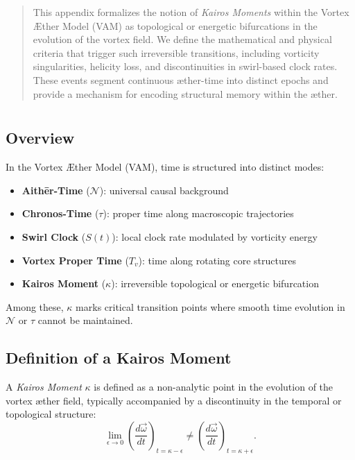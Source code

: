 \documentclass[12pt]{article}
\begin{document}
    \titlepageOpen

    \begin{abstract}
        This appendix formalizes the notion of \textit{Kairos Moments} within the Vortex \AE{}ther Model (VAM) as topological or energetic bifurcations in the evolution of the vortex field. We define the mathematical and physical criteria that trigger such irreversible transitions, including vorticity singularities, helicity loss, and discontinuities in swirl-based clock rates. These events segment continuous æther-time into distinct epochs and provide a mechanism for encoding structural memory within the æther.
    \end{abstract}



    \titlepageClose
    \fi

    \section{\appendixtitle}


    \subsection*{Overview}
    In the Vortex \AE{}ther Model (VAM), time is structured into distinct modes:
    \begin{itemize}
        \item \textbf{Aith\={e}r-Time} (\( \mathcal{N} \)): universal causal background
        \item \textbf{Chronos-Time} (\( \tau \)): proper time along macroscopic trajectories
        \item \textbf{Swirl Clock} (\( S(t) \)): local clock rate modulated by vorticity energy
        \item \textbf{Vortex Proper Time} (\( T_v \)): time along rotating core structures
        \item \textbf{Kairos Moment} (\( \kappa \)): irreversible topological or energetic bifurcation
    \end{itemize}
    Among these, \( \kappa \) marks critical transition points where smooth time evolution in \( \mathcal{N} \) or \( \tau \) cannot be maintained.

    \subsection*{Definition of a Kairos Moment}
    A \textit{Kairos Moment} \( \kappa \) is defined as a non-analytic point in the evolution of the vortex æther field, typically accompanied by a discontinuity in the temporal or topological structure:
    \begin{equation}
        \lim_{\epsilon \to 0} \left( \frac{d\vec{\omega}}{dt} \right)_{t = \kappa - \epsilon}
        \neq
        \left( \frac{d\vec{\omega}}{dt} \right)_{t = \kappa + \epsilon}.
    \end{equation}
\end{document}
